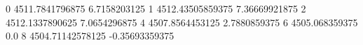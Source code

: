 0 4511.7841796875 6.7158203125
1 4512.43505859375 7.36669921875
2 4512.1337890625 7.0654296875
4 4507.8564453125 2.7880859375
6 4505.068359375 0.0
8 4504.71142578125 -0.35693359375
